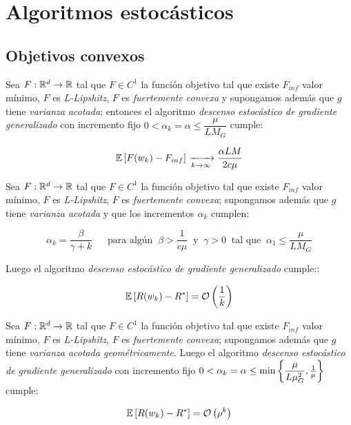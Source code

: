 \section{Algoritmos estoc\'asticos}

\subsection{Objetivos convexos}

\begin{theorem}
	Sea $F: {\mathbb{R}}^d \rightarrow {\mathbb{R}}$ tal que $F \in C^1$ la funci\'on objetivo tal que existe $F_{inf}$ valor m\'inimo, $F$ es \textit{L-Lipshitz}, $F$ es \textit{fuertemente convexa} y supongamos adem\'as que $g$ tiene \textit{varianza acotada}; entonces el algoritmo \textit{descenso estoc\'astico de gradiente generalizado} con incremento fijo $0  <  \alpha_k = \alpha \leq \dfrac{\mu}{LM_G}$ cumple:

	\begin{equation*}
	\mathbb{E} \left[F(w_k) - F_{inf}\right] \xrightarrow[k \rightarrow \infty]{} \dfrac{\alpha LM}{2 c \mu}
	\end{equation*}
	
\end{theorem}

\begin{theorem}
	Sea $F: {\mathbb{R}}^d \rightarrow {\mathbb{R}}$ tal que $F \in C^1$ la funci\'on objetivo tal que existe $F_{inf}$ valor m\'inimo, $F$ es \textit{L-Lipshitz}, $F$ es \textit{fuertemente convexa}; supongamos adem\'as que $g$ tiene \textit{varianza acotada} y que los incrementos $\alpha_k$ cumplen:
	
	\begin{equation}
	\alpha_k =  \dfrac{\beta}{\gamma + k} \quad \ \text{ para alg\'un } \ \beta > \frac{1}{c \mu} \  \text{ y } \ \gamma > 0 \  \text{ tal que } \ \alpha_1 \leq \dfrac{\mu}{L M_G} 
	\end{equation}
	
	Luego el algoritmo \textit{descenso estoc\'astico de gradiente generalizado} cumple::
	
	\begin{equation*}
		\mathbb{E} \left[R(w_k) - R^*\right] = \mathcal{O} \left(\frac{1}{k}\right)
	\end{equation*}
	
\end{theorem}

\begin{theorem}
	Sea $F: {\mathbb{R}}^d \rightarrow {\mathbb{R}}$ tal que $F \in C^1$ la funci\'on objetivo tal que existe $F_{inf}$ valor m\'inimo, $F$ es \textit{L-Lipshitz}, $F$ es \textit{fuertemente convexa}; supongamos adem\'as que $g$ tiene \textit{varianza acotada geom\'etricamente}. Luego el algoritmo \textit{descenso estoc\'astico de gradiente generalizado} con incremento fijo $0  < \alpha_k = \alpha \leq \min\left\lbrace\dfrac{\mu}{L \mu_G^2}, \frac{1}{ \mu}\right\rbrace $ cumple:
	
	\begin{equation*}
	\mathbb{E} \left[R(w_k) - R^*\right] = \mathcal{O} \left(\rho^{k}\right)
	\end{equation*}
	
\end{theorem}

